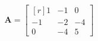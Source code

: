 \documentclass[12 pt]{slides}
\begin{document}
\begingroup
\[\textbf{A} = \begin{bmatrix*}[r]1 & -1 & 0\\-1 & -2 & -4\\0 & -4 & 5\end{bmatrix*}\]
\endgroup
\end{document}
